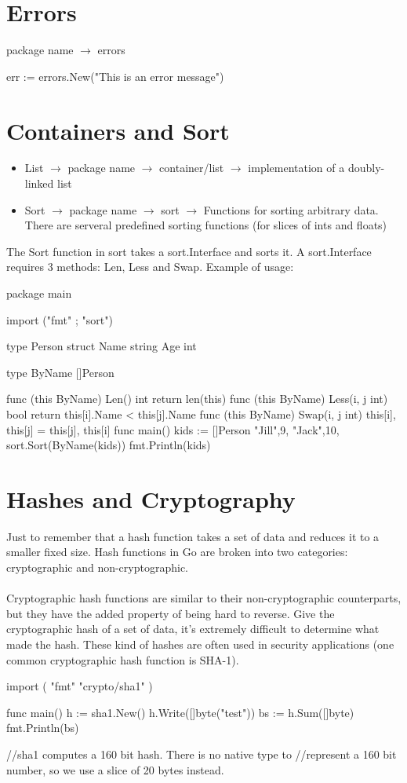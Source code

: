 \documentclass[twoside,a4paper,english]{report}
\begin{document}
\section{Errors}
package name $\rightarrow$ errors
\begin{go}
err := errors.New("This is an error message")
\end{go}   
\section{Containers and Sort}
\begin{itemize}
\item List $\rightarrow$ package name $\rightarrow$ container/list $\rightarrow$ implementation of a doubly-linked list
\item Sort $\rightarrow$ package name $\rightarrow$ sort $\rightarrow$ Functions for sorting arbitrary data. There are serveral predefined sorting functions (for slices of ints and floats)
\end{itemize}
The Sort function in sort takes a sort.Interface and sorts it. A sort.Interface requires 3 methods: Len, Less and Swap. Example of usage:
\begin{go}
package main

import ("fmt" ; "sort")

type Person struct {
    Name string
    Age int 
}

type ByName []Person

func (this ByName) Len() int {
    return len(this)
}
func (this ByName) Less(i, j int) bool {
    return this[i].Name < this[j].Name
}
func (this ByName) Swap(i, j int) {
    this[i], this[j] = this[j], this[i]
}
func main() {
     kids := []Person{
            {"Jill",9},
            {"Jack",10},
     }
     sort.Sort(ByName(kids))
     fmt.Println(kids)
}
\end{go}
\section{Hashes and Cryptography}
Just to remember that a hash function takes a set of data and reduces it to a smaller fixed size. Hash functions in Go are broken into two categories: cryptographic and non-cryptographic.\\\\

Cryptographic hash functions are similar to their non-cryptographic counterparts, but they have the added property of being hard to reverse. Give the cryptographic hash of a set of data, it's extremely difficult to determine what made the hash. These kind of hashes are often used in security applications (one common cryptographic hash function is SHA-1).
\begin{go}
import (
    "fmt"
    "crypto/sha1"
)

func main() {
    h := sha1.New()
    h.Write([]byte("test"))
    bs := h.Sum([]byte{})
    fmt.Println(bs)
}

//sha1 computes a 160 bit hash. There is no native type to 
//represent a 160 bit number, so we use a slice of 20 bytes instead.
\end{go}
\end{document}
